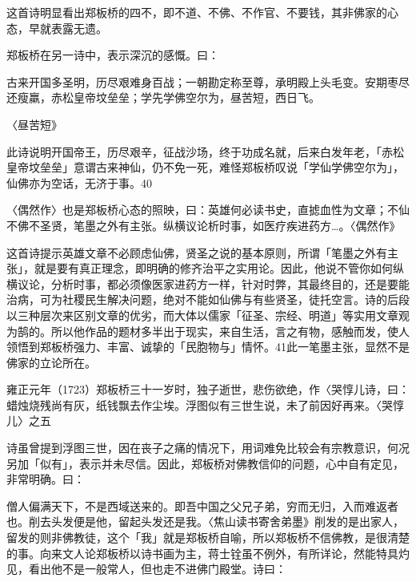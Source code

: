 这首诗明显看出郑板桥的四不，即不道、不佛、不作官、不要钱，其非佛家的心态，早就表露无遗。

郑板桥在另一诗中，表示深沉的感慨。曰：

\begin{BookQuote}
古来开国多圣明，历尽艰难身百战；一朝勘定称至尊，承明殿上头毛变。安期枣尽还瘦羸，赤松皇帝坟垒垒；学先学佛空尔为，昼苦短，西日飞。
\end{BookQuote}

〈昼苦短》

此诗说明开国帝王，历尽艰辛，征战沙场，终于功成名就，后来白发年老，「赤松皇帝坟垒垒」意谓古来神仙，仍不免一死，难怪郑板桥叹说「学仙学佛空尔为」，仙佛亦为空话，无济于事。40

\begin{BookQuote}
〈偶然作〉也是郑板桥心态的照映，曰：英雄何必读书史，直摅血性为文章；不仙不佛不圣贤，笔墨之外有主张。纵横议论析时事，如医疗疾进药方…。〈偶然作》
\end{BookQuote}

这首诗提示英雄文章不必顾虑仙佛，贤圣之说的基本原则，所谓「笔墨之外有主张」，就是要有真正理念，即明确的修齐治平之实用论。因此，他说不管你如何纵横议论，分析时事，都必须像医家进药方一样，针对时弊，其最终目的，还是要能治病，可为社稷民生解决问题，绝对不能如仙佛与有些贤圣，徒托空言。诗的后段以三种层次来区别文章的优劣，而大体以儒家「征圣、宗经、明道」等实用文章观为鹄的。所以他作品的题材多半出于现实，来自生活，言之有物，感触而发，使人领悟到郑板桥强力、丰富、诚挚的「民胞物与」情怀。41此一笔墨主张，显然不是佛家的立论所在。

\vfill
\begin{BookNotes}
\end{BookNotes}

\noindent 雍正元年（1723）郑板桥三十一岁时，独子逝世，悲伤欲绝，作〈哭惇儿诗，曰：蜡烛烧残尚有灰，纸钱飘去作尘埃。浮图似有三世生说，未了前因好再来。〈哭惇儿〉之五

诗虽曾提到浮图三世，因在丧子之痛的情况下，用词难免比较会有宗教意识，何况另加「似有」，表示并未尽信。因此，郑板桥对佛教信仰的问题，心中自有定见，非常明确。曰：

僧人偏满天下，不是西域送来的。即吾中国之父兄子弟，穷而无归，入而难返者也。削去头发便是他，留起头发还是我。〈焦山读书寄舍弟墨》削发的是出家人，留发的则非佛教徒，这个「我」就是郑板桥自喻，所以郑板桥不信佛教，是很清楚的事。向来文人论郑板桥以诗书画为主，蒋士铨虽不例外，有所详论，然能特具灼见，看出他不是一般常人，但也走不进佛门殿堂。诗曰：

